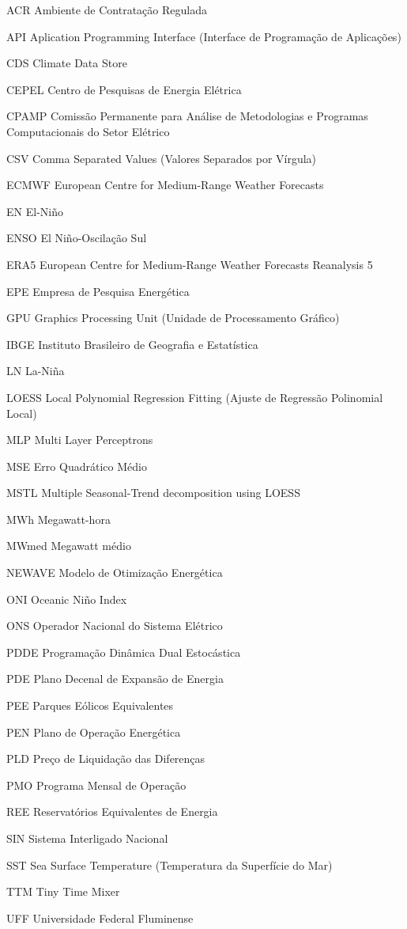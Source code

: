 \documentclass[
  12pt,				                                                                                                          %
  oneside,                                                                                                              %
  a4paper,			                                                                                                        %
  chapter = Title,		                                                                                                  %
  section = Title,		                                                                                                  %
  subsection = Title,	                                                                                                  %
  english,			                                                                                                        %
  brazil,			                                                                                                          %
  sumario = tradicional
  ]{abntex2-uff}
\begin{document}
\begin{siglas}
  \item[ACR] Ambiente de Contratação Regulada
  \item[API] Aplication Programming Interface (Interface de Programação de Aplicações)
  \item[CDS] Climate Data Store
  \item[CEPEL] Centro de Pesquisas de Energia Elétrica
  \item[CPAMP] Comissão Permanente para Análise de Metodologias e Programas Computacionais do Setor Elétrico
  \item[CSV] Comma Separated Values (Valores Separados por Vírgula)
  \item[ECMWF] European Centre for Medium-Range Weather Forecasts
  \item[EN] El-Niño
  \item[ENSO] El Niño-Oscilação Sul
  \item[ERA5] European Centre for Medium-Range Weather Forecasts Reanalysis 5
  \item[EPE] Empresa de Pesquisa Energética
  \item[GPU] Graphics Processing Unit (Unidade de Processamento Gráfico)
  \item[IBGE] Instituto Brasileiro de Geografia e Estatística
  \item[LN] La-Niña
  \item[LOESS] Local Polynomial Regression Fitting (Ajuste de Regressão Polinomial Local)
  \item[MLP] Multi Layer Perceptrons
  \item[MSE] Erro Quadrático Médio
  \item[MSTL] Multiple Seasonal-Trend decomposition using LOESS
  \item[MWh] Megawatt-hora
  \item[MWmed] Megawatt médio
  \item[NEWAVE] Modelo de Otimização Energética
  \item[ONI] Oceanic Niño Index
  \item[ONS] Operador Nacional do Sistema Elétrico
  \item[PDDE] Programação Dinâmica Dual Estocástica
  \item[PDE] Plano Decenal de Expansão de Energia
  \item[PEE] Parques Eólicos Equivalentes
  \item[PEN] Plano de Operação Energética
  \item[PLD] Preço de Liquidação das Diferenças
  \item[PMO] Programa Mensal de Operação
  \item[REE] Reservatórios Equivalentes de Energia
  \item[SIN] Sistema Interligado Nacional
  \item[SST] Sea Surface Temperature (Temperatura da Superfície do Mar)
  \item[TTM] Tiny Time Mixer
  \item[UFF] Universidade Federal Fluminense
\end{siglas}
\end{document}
